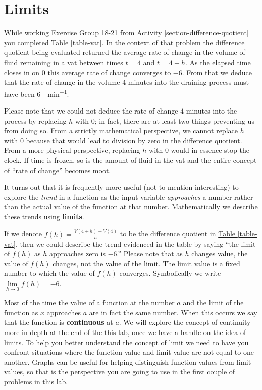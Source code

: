 \documentclass[10pt,oneside,]{book}
\newcommand{\terminology}[1]{\textbf{#1}}
\theoremstyle{plain}
\theoremstyle{definition}
\numberwithin{equation}{section}
\newcommand{\fe}[2]{#1\mathopen{}\left(#2\right)\mathclose{}}
\begin{document}
\section[Limits]{Limits}\label{section-limits}
While working \hyperlink{exercisegroup-vat}{Exercise Group 18-21} from \hyperref[section-difference-quotient]{Activity \ref{section-difference-quotient}} you completed \hyperref[table-vat]{Table \ref{table-vat}}. In the context of that problem the difference quotient being evaluated returned the average rate of change in the volume of fluid remaining in a vat between times \(t=4\) and \(t=4+h\). As the elapsed time closes in on \(0\) this average rate of change converges to \(-6\). From that we deduce that the rate of change in the volume \(4\) minutes into the draining process must have been \SI{6}{\gallon\per\minute}.%
\par
Please note that we could not deduce the rate of change \(4\) minutes into the process by replacing \(h\) with \(0\); in fact, there are at least two things preventing us from doing so. From a strictly mathematical perspective, we cannot replace \(h\) with \(0\) because that would lead to division by zero in the difference quotient. From a more physical perspective, replacing \(h\) with \(0\) would in essence stop the clock. If time is frozen, so is the amount of fluid in the vat and the entire concept of ``rate of change'' becomes moot.%
\par
It turns out that it is frequently more useful (not to mention interesting) to explore the \emph{trend} in a function as the input variable \emph{approaches} a number rather than the actual value of the function at that number. Mathematically we describe these trends using \terminology{limits}.%
\par
If we denote \(\fe{f}{h}=\frac{\fe{V}{4+h}-\fe{V}{4}}{h}\) to be the difference quotient in \hyperref[table-vat]{Table \ref{table-vat}}, then we could describe the trend evidenced in the table by saying ``the limit of \(\fe{f}{h}\) as \(h\) approaches zero is \(-6\).'' Please note that as \(h\) changes value, the value of \(\fe{f}{h}\) changes, not the value of the limit. The limit value is a fixed number to which the value of \(\fe{f}{h}\) converges. Symbolically we write \(\lim\limits_{h\to0}\fe{f}{h}=-6\).%
\par
Most of the time the value of a function at the number \(a\) and the limit of the function as \(x\) approaches \(a\) are in fact the same number. When this occurs we say that the function is \terminology{continuous} at \(a\). We will explore the concept of continuity more in depth at the end of the this lab, once we have a handle on the idea of limits. To help you better understand the concept of limit we need to have you confront situations where the function value and limit value are not equal to one another. Graphs can be useful for helping distinguish function values from limit values, so that is the perspective you are going to use in the first couple of problems in this lab.%
\typeout{************************************************}
\typeout{************************************************}
\end{document}
